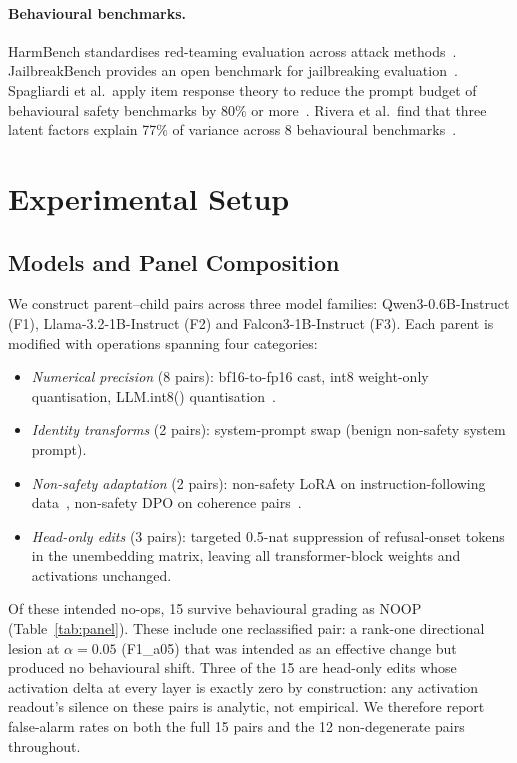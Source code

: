 \documentclass[11pt,letterpaper]{article}
\begin{document}
\paragraph{Behavioural benchmarks.}
HarmBench standardises red-teaming evaluation across attack methods~\citep{Mazeika2024}. JailbreakBench provides an open benchmark for jailbreaking evaluation~\citep{Chao2024}. Spagliardi et al.\ apply item response theory to reduce the prompt budget of behavioural safety benchmarks by 80\% or more~\citep{Spagliardi2026}. Rivera et al.\ find that three latent factors explain 77\% of variance across 8 behavioural benchmarks~\citep{Rivera2026}.


\section{Experimental Setup}
\label{sec:setup}

\subsection{Models and Panel Composition}
\label{sec:panel}

We construct parent--child pairs across three model families: Qwen3-0.6B-Instruct (F1), Llama-3.2-1B-Instruct (F2) and Falcon3-1B-Instruct (F3). Each parent is modified with operations spanning four categories:

\begin{itemize}
\item \emph{Numerical precision} (8 pairs): bf16-to-fp16 cast, int8 weight-only quantisation, LLM.int8() quantisation~\citep{Dettmers2022}.
\item \emph{Identity transforms} (2 pairs): system-prompt swap (benign non-safety system prompt).
\item \emph{Non-safety adaptation} (2 pairs): non-safety LoRA on instruction-following data~\citep{Hu2021}, non-safety DPO on coherence pairs~\citep{Rafailov2023}.
\item \emph{Head-only edits} (3 pairs): targeted 0.5-nat suppression of refusal-onset tokens in the unembedding matrix, leaving all transformer-block weights and activations unchanged.
\end{itemize}

Of these intended no-ops, 15 survive behavioural grading as NOOP (Table~\ref{tab:panel}). These include one reclassified pair: a rank-one directional lesion at $\alpha = 0.05$ (F1\_a05) that was intended as an effective change but produced no behavioural shift. Three of the 15 are head-only edits whose activation delta at every layer is exactly zero by construction: any activation readout's silence on these pairs is analytic, not empirical. We therefore report false-alarm rates on both the full 15 pairs and the 12 non-degenerate pairs throughout.
\end{document}
